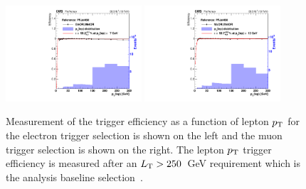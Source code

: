   \begin{figure}[!h]
    \begin{center}
    \includegraphics[width=0.45\textwidth]{Plots/trigger/LepPt_PFJet450_EffFit_test_HLT_EleORORHLT_MetOR.pdf}
    \includegraphics[width=0.45\textwidth]{Plots/trigger/LepPt_PFJet450_EffFit_test_HLT_MuORORHLT_MetOR.pdf}
  \end{center}
  \caption[The trigger efficiency as a function of lepton $\pt$]{Measurement of the trigger efficiency as a function of lepton $\pt$ for the
    electron trigger selection is shown on the left and the muon trigger selection is shown on the right. The lepton $\pt$ trigger efficiency is measured after an $L_{\rm T}>250$~GeV requirement which is the analysis baseline selection~\cite{trigger}.
  \label{fig:trig_eff_leptonPt}}
\end{figure}
\newpage
